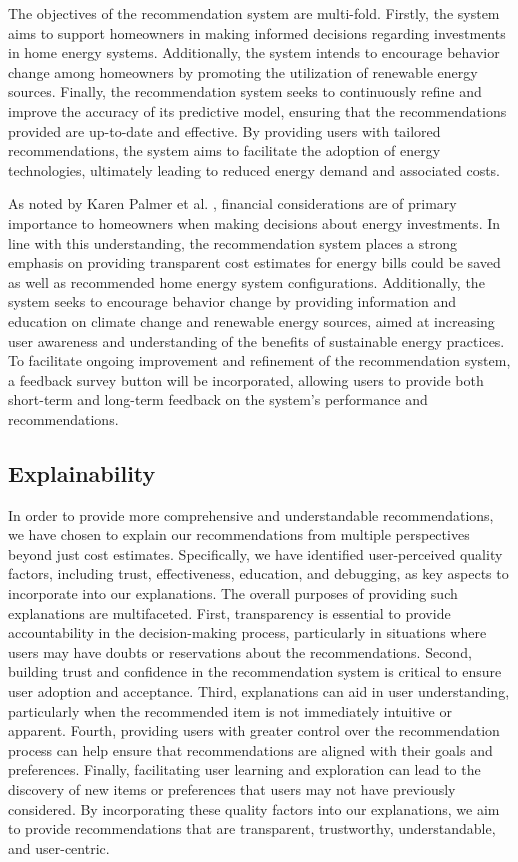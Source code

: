 The objectives of the recommendation system are multi-fold. 
Firstly, the system aims to support homeowners in making informed decisions regarding investments in home energy systems. 
Additionally, the system intends to encourage behavior change among homeowners by promoting the utilization of renewable energy sources. 
Finally, the recommendation system seeks to continuously refine and improve the accuracy of its predictive model, ensuring that the recommendations provided are up-to-date and effective. 
By providing users with tailored recommendations, the system aims to facilitate the adoption of energy technologies, ultimately leading to reduced energy demand and associated costs. 

As noted by Karen Palmer et al. \cite{informationgap}, financial considerations are of primary importance to homeowners when making decisions about energy investments. 
In line with this understanding, the recommendation system places a strong emphasis on providing transparent cost estimates for energy bills could be saved as well as recommended home energy system configurations. 
Additionally, the system seeks to encourage behavior change by providing information and education on climate change and renewable energy sources, aimed at increasing user awareness and understanding of the benefits of sustainable energy practices. 
To facilitate ongoing improvement and refinement of the recommendation system, a feedback survey button will be incorporated, allowing users to provide both short-term and long-term feedback on the system's performance and recommendations. 

\subsection{Explainability}

In order to provide more comprehensive and understandable recommendations, we have chosen to explain our recommendations from multiple perspectives beyond just cost estimates. 
Specifically, we have identified user-perceived quality factors, including trust, effectiveness, education, and debugging, as key aspects to incorporate into our explanations. 
The overall purposes of providing such explanations are multifaceted. 
First, transparency is essential to provide accountability in the decision-making process, particularly in situations where users may have doubts or reservations about the recommendations. 
Second, building trust and confidence in the recommendation system is critical to ensure user adoption and acceptance. 
Third, explanations can aid in user understanding, particularly when the recommended item is not immediately intuitive or apparent. 
Fourth, providing users with greater control over the recommendation process can help ensure that recommendations are aligned with their goals and preferences. 
Finally, facilitating user learning and exploration can lead to the discovery of new items or preferences that users may not have previously considered. 
By incorporating these quality factors into our explanations, we aim to provide recommendations that are transparent, trustworthy, understandable, and user-centric. 

